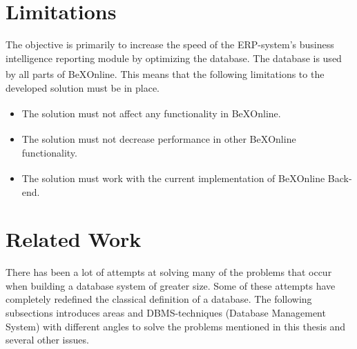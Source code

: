 \documentclass{cslthse-msc}
\newcommand{\bex}{BeX\textsuperscript{\textregistered}}
\begin{document}
\section{Limitations}
The objective is primarily to increase the speed of the ERP-system's business intelligence reporting module by optimizing the database. The database is used by all parts of \bex Online. This means that the following limitations to the developed solution must be in place.

\begin{itemize}
\item The solution must not affect any functionality in \bex Online.
\item The solution must not decrease performance in other \bex Online functionality.
\item The solution must work with the current implementation of \bex Online Back-end.
\end{itemize}

\section{Related Work}
There has been a lot of attempts at solving many of the problems that occur when building a database system of greater size. Some of these attempts have completely redefined the classical definition of a database. The following subsections introduces areas and DBMS-techniques (Database Management System) with different angles to solve the problems mentioned in this thesis and several other issues.
\end{document}
